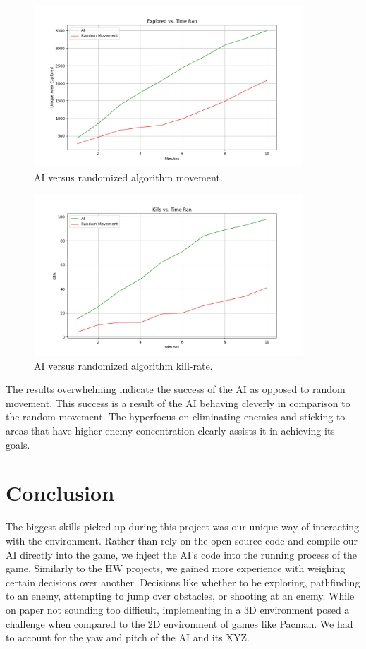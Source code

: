 \documentclass[11pt,a4paper]{article}
\begin{document}
\begin{figure}[H]
    \centering
    \includegraphics[width=0.9\textwidth]{areaExploredGraph.png}
    \caption{AI versus randomized algorithm movement.}
    \label{fig:three}
\end{figure}
\begin{figure}[H]
    \centering
    \includegraphics[width=0.9\textwidth]{killsGraph.png}
    \caption{AI versus randomized algorithm kill-rate.}
    \label{fig:four}
\end{figure}

The results overwhelming indicate the success of the AI as opposed to random movement. This success is a result of the AI behaving cleverly in comparison to the random movement. The hyperfocus on eliminating enemies and sticking to areas that have higher enemy concentration clearly assists it in achieving its goals.

\section{Conclusion}
The biggest skills picked up during this project was our unique way of interacting with the environment. Rather than rely on the open-source code and compile our AI directly into the game, we inject the AI’s code into the running process of the game. Similarly to the HW projects, we gained more experience with weighing certain decisions over another. Decisions like whether to be exploring, pathfinding to an enemy, attempting to jump over obstacles, or shooting at an enemy. While on paper not sounding too difficult, implementing in a 3D environment posed a challenge when compared to the 2D environment of games like Pacman. We had to account for the yaw and pitch of the AI and its XYZ. 
\end{document}
